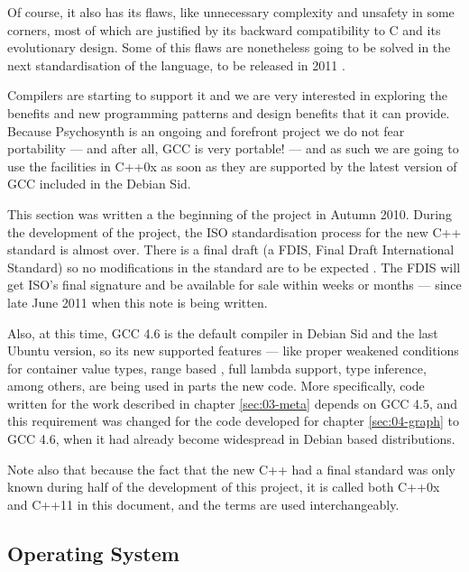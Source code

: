 Of course, it also has its flaws, like unnecessary complexity and
unsafety in some corners, most of which are justified by its backward
compatibility to C and its evolutionary design. Some of this flaws are
nonetheless going to be solved in the next standardisation of the
language, to be released in 2011 \cite{herb10iso}.

Compilers are starting to support it and we are very interested in
exploring the benefits and new programming patterns and design
benefits that it can provide. Because Psychosynth is an ongoing and
forefront project we do not fear portability --- and after all, GCC is
very portable! --- and as such we are going to use the facilities in
C++0x as soon as they are supported by the latest version of GCC
included in the Debian Sid.

\begin{mynote}
  This section was written a the beginning of the project in Autumn
  2010. During the development of the project, the ISO standardisation
  process for the new C++ standard is almost over. There is a final
  draft (a FDIS, Final Draft International Standard) so no
  modifications in the standard are to be expected
  \cite{herb11iso}. The FDIS will get ISO's final signature and
  be available for sale within weeks or months --- since late June
  2011 when this note is being written.

  Also, at this time, GCC 4.6 is the default compiler in Debian Sid
  and the last Ubuntu version, so its new supported features --- like
  proper weakened conditions for container value types, range based
  , full lambda support, type inference, among others, are
  being used in parts the new code. More specifically, code written
  for the work described in chapter \ref{sec:03-meta} depends on GCC
  4.5, and this requirement was changed for the code developed for
  chapter \ref{sec:04-graph} to GCC 4.6, when it had already become
  widespread in Debian based distributions.

  Note also that because the fact that the new C++ had a final
  standard was only known during half of the development of this
  project, it is called both C++0x and C++11 in this document, and the
  terms are used interchangeably.
\end{mynote}

\subsection{Operating System}

